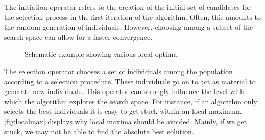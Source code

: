 \documentclass[./../../paper.tex]{subfiles}
\begin{document}
The initiation operator refers to the creation of the initial set of candidates for the selection process in the first iteration of the algorithm. Often, this amounts to the random generation of individuals.  However, choosing among a subset of the search space can allow for a faster convergence. 

\begin{figure}[htbp]
    \centering

        \caption{Schematic example showing various local optima.}

        \label{fig:localmax}

\end{figure}

The selection operator chooses a set of individuals among the population according to a selection procedure. These individuals go on to act as material to generate new individuals. This operator can strongly influence the level with which the algorithm explores the search space. For instance, if an algorithm only selects the best individuals it is easy to get stuck within an local maximum. \autoref{fig:localmax} displays why local maxima should be avoided. Mainly, if we get stuck, we may not be able to find the absolute best solution.
\end{document}
